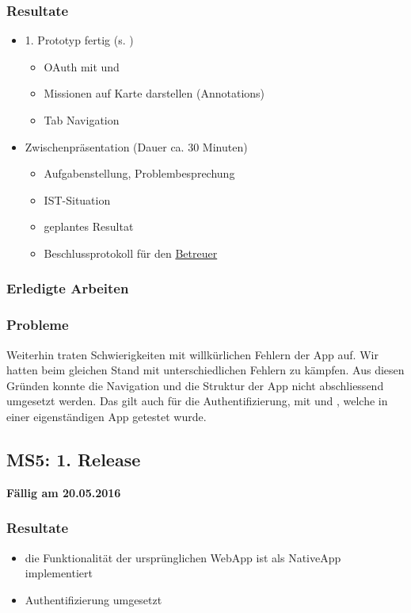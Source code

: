 \subsubsection{Resultate}
\begin{itemize}
	\item 1. Prototyp fertig (s. )
	\begin{itemize}
		\item OAuth mit  und 
		\item Missionen auf Karte darstellen (Annotations)
		\item Tab Navigation
	\end{itemize}
	\item Zwischenpräsentation (Dauer ca. 30 Minuten)
	\begin{itemize}
		\item Aufgabenstellung, Problembesprechung
		\item IST-Situation
		\item geplantes Resultat
		\item Beschlussprotokoll für den \hyperref[pm-rollen]{Betreuer}
	\end{itemize}
\end{itemize}

\subsubsection{Erledigte Arbeiten}


\subsubsection{Probleme}
Weiterhin traten Schwierigkeiten mit willkürlichen Fehlern der  App auf. 
Wir hatten beim gleichen Stand mit unterschiedlichen Fehlern zu kämpfen.
Aus diesen Gründen konnte die Navigation und die Struktur der App nicht abschliessend umgesetzt werden.
Das gilt auch für die Authentifizierung, mit  und , welche in einer eigenständigen App getestet wurde.

\subsection{MS5: 1. Release}
\label{pm-ms5}
\textbf{Fällig am 20.05.2016}
\subsubsection{Resultate}
\begin{itemize}
	\item die Funktionalität der ursprünglichen \kort{} \gls{WebApp} ist als \gls{NativeApp} implementiert
	\item {} Authentifizierung umgesetzt
\end{itemize}

